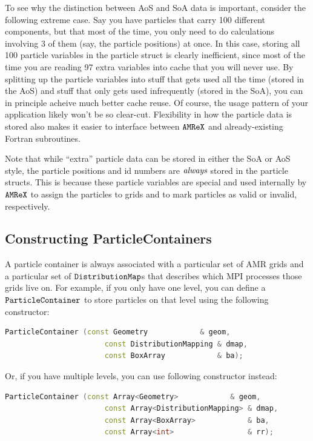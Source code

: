 To see why the distinction between AoS and SoA data is important, consider the following extreme case. Say you have particles that carry 100 different components,
but that most of the time, you only need to do calculations involving 3 of them (say, the particle positions) at once. In this case, storing all 100 particle variables in the particle
struct is clearly inefficient, since most of the time you are reading 97 extra variables into cache that you will never use. By splitting up the particle variables into stuff that gets 
used all the time (stored in the AoS) and stuff that only gets used infrequently (stored in the SoA), you can in principle acheive much better cache reuse. Of course, the usage pattern of your application likely won't be so clear-cut. Flexibility in how the particle data is stored also makes it easier to interface between $\tt{AMReX}$ and already-existing Fortran subroutines.

Note that while ``extra'' particle data can be stored in either the SoA or AoS style, the particle positions and id numbers are $\emph{always}$ stored in the particle
structs. This is because these particle variables are special and used internally by $\tt{AMReX}$ to assign the particles to grids and to mark particles as valid or invalid, respectively.

\subsection{Constructing ParticleContainers}

A particle container is always associated with a particular set of AMR grids and a particular set of $\tt{DistributionMap}$s that describes which MPI processes those grids live on.
For example, if you only have one level, you can define a $\tt{ParticleContainer}$ to store particles on that level using the following constructor:

\begin{lstlisting}[language=cpp]
    ParticleContainer (const Geometry            & geom,
                       const DistributionMapping & dmap,
                       const BoxArray            & ba);
\end{lstlisting}

Or, if you have multiple levels, you can use following constructor instead:

\begin{lstlisting}[language=cpp]
    ParticleContainer (const Array<Geometry>            & geom,
                       const Array<DistributionMapping> & dmap,
                       const Array<BoxArray>            & ba,
                       const Array<int>                 & rr);
\end{lstlisting}

